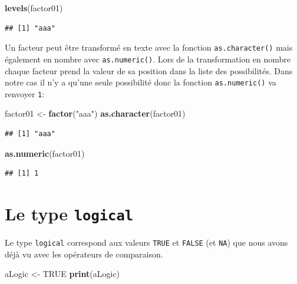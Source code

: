 \documentclass[]{book}
\newenvironment{Shaded}{\begin{snugshade}}{\end{snugshade}}
\newcommand{\KeywordTok}[1]{\textcolor[rgb]{0.13,0.29,0.53}{\textbf{#1}}}
\newcommand{\StringTok}[1]{\textcolor[rgb]{0.31,0.60,0.02}{#1}}
\newcommand{\OtherTok}[1]{\textcolor[rgb]{0.56,0.35,0.01}{#1}}
\newcommand{\NormalTok}[1]{#1}
\begin{document}
\begin{Shaded}
\begin{Highlighting}[]
\KeywordTok{levels}\NormalTok{(factor01)}
\end{Highlighting}
\end{Shaded}

\begin{verbatim}
## [1] "aaa"
\end{verbatim}

Un facteur peut être transformé en texte avec la fonction
\texttt{as.character()} mais également en nombre avec
\texttt{as.numeric()}. Lors de la transformation en nombre chaque
facteur prend la valeur de sa position dans la liste des possibilités.
Dans notre cas il n'y a qu'une seule possibilité donc la fonction
\texttt{as.numeric()} va renvoyer \texttt{1}:

\begin{Shaded}
\begin{Highlighting}[]
\NormalTok{factor01 <-}\StringTok{ }\KeywordTok{factor}\NormalTok{(}\StringTok{"aaa"}\NormalTok{)}
\KeywordTok{as.character}\NormalTok{(factor01)}
\end{Highlighting}
\end{Shaded}

\begin{verbatim}
## [1] "aaa"
\end{verbatim}

\begin{Shaded}
\begin{Highlighting}[]
\KeywordTok{as.numeric}\NormalTok{(factor01)}
\end{Highlighting}
\end{Shaded}

\begin{verbatim}
## [1] 1
\end{verbatim}

\section{\texorpdfstring{Le type
\texttt{logical}}{Le type logical}}\label{le-type-logical}

Le type \texttt{logical} correspond aux valeurs \texttt{TRUE} et
\texttt{FALSE} (et \texttt{NA}) que nous avons déjà vu avec les
opérateurs de comparaison.

\begin{Shaded}
\begin{Highlighting}[]
\NormalTok{aLogic <-}\StringTok{ }\OtherTok{TRUE}
\KeywordTok{print}\NormalTok{(aLogic)}
\end{Highlighting}
\end{Shaded}
\end{document}
